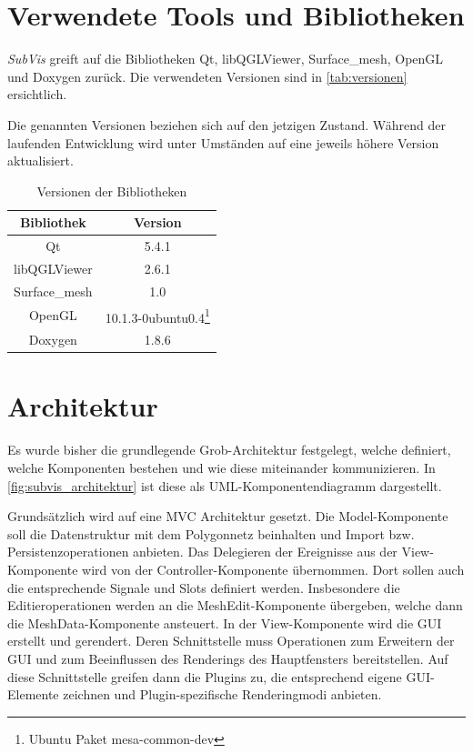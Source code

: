 \section{Verwendete Tools und Bibliotheken}

\emph{SubVis} greift auf die Bibliotheken Qt, libQGLViewer, Surface\_mesh, OpenGL und Doxygen zurück.
Die verwendeten Versionen sind in \autoref{tab:versionen} ersichtlich.

Die genannten Versionen beziehen sich auf den jetzigen Zustand. 
Während der laufenden Entwicklung wird unter Umständen auf eine jeweils höhere Version aktualisiert.

\begin{table}[h]
\center
\caption{Versionen der Bibliotheken}
\label{tab:versionen}
\begin{tabular}{c|c}
Bibliothek & Version\\
\hline
Qt & 5.4.1\\
libQGLViewer & 2.6.1\\
Surface\_mesh & 1.0\\
OpenGL & 10.1.3-0ubuntu0.4\footnote{Ubuntu Paket mesa-common-dev}\\
Doxygen & 1.8.6\\
\end{tabular}
\end{table}

\section{Architektur}

Es wurde bisher die grundlegende Grob-Architektur festgelegt, welche definiert, welche Komponenten bestehen und wie diese miteinander kommunizieren.
In \autoref{fig:subvis_architektur} ist diese als UML-Komponentendiagramm dargestellt.

Grundsätzlich wird auf eine \ac{MVC} Architektur gesetzt.
Die Model-Komponente soll die Datenstruktur mit dem Polygonnetz beinhalten und Import bzw. Persistenzoperationen anbieten.
Das Delegieren der Ereignisse aus der View-Komponente wird von der Controller-Komponente übernommen. 
Dort sollen auch die entsprechende Signale und Slots definiert werden.
Insbesondere die Editieroperationen werden an die MeshEdit-Komponente übergeben, welche dann die MeshData-Komponente ansteuert.
In der View-Komponente wird die GUI erstellt und gerendert. 
Deren Schnittstelle muss Operationen zum Erweitern der GUI und zum Beeinflussen des Renderings des Hauptfensters bereitstellen.
Auf diese Schnittstelle greifen dann die Plugins zu, die entsprechend eigene GUI-Elemente zeichnen und Plugin-spezifische Renderingmodi anbieten.


